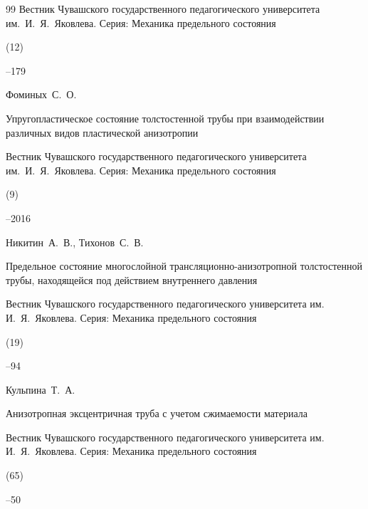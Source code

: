 \begin{thebibliography}{99}
\jour Вестник Чувашского государственного педагогического университета им.~И.~Я.~Яковлева. Серия: Механика предельного состояния


(12)

--179





\by Фоминых~С.~О.

\paper Упругопластическое состояние толстостенной трубы при взаимодействии различных видов пластической анизотропии

\jour Вестник Чувашского государственного педагогического университета им.~И.~Я.~Яковлева. Серия: Механика предельного состояния


(9)

--2016







\by Никитин~А.~В., Тихонов~С.~В.

\paper Предельное состояние многослойной трансляционно-анизотропной толстостенной трубы, находящейся под действием внутреннего давления

\jour Вестник Чувашского государственного педагогического университета им. И.~Я.~Яковлева. Серия: Механика предельного состояния


(19)

--94





\by Кульпина~Т.~А.

\paper Анизотропная эксцентричная труба с учетом сжимаемости материала

\jour Вестник Чувашского государственного педагогического университета им. И.~Я.~Яковлева. Серия: Механика предельного состояния


(65)

--50





\end{thebibliography}
